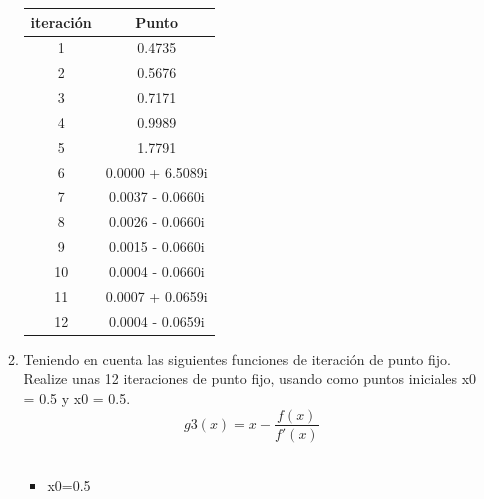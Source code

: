\documentclass{udparticle}
\begin{document}
\begin{enumerate}
\begin{enumerate}
\begin{table}[H]
\begin{tabular} { |c|c|}
        \hline
        iteración  &  Punto\\
        \hline
        1 &  0.4735       \\
         \hline
        2 &   0.5676     \\
         \hline
        3 &  0.7171
       \\
         \hline
        4 &   0.9989     \\
         \hline
        5 & 1.7791        \\
         \hline
        6 &  0.0000 + 6.5089i      \\
         \hline
        7 &   0.0037 - 0.0660i       \\
         \hline
        8 &     0.0026 - 0.0660i   \\
         \hline
        9 &   0.0015 - 0.0660i       \\
         \hline
        10 &    0.0004 - 0.0660i      \\
         \hline
        11 &    0.0007 + 0.0659i \\
         \hline
        12 &   0.0004 - 0.0659i       \\
        \hline
        
        \end{tabular}
        
    \end{table}
 \vspace{3cm}   
 \item Teniendo en cuenta las siguientes funciones de iteración de punto fijo.  Realize unas 12 iteraciones de punto fijo, usando como puntos iniciales x0 = 0.5 y x0 = 0.5.\\   
 
 \begin{equation}
 g3(x) = x-\frac{f(x)}
{f'(x)}
\end{equation}
\\
 \begin{itemize}
\item x0=0.5
\end{itemize}

\begin{table}[H]
    \centering
        \begin{tabular} { |c|c|}
        

\end{tabular}
\end{table}
\end{enumerate}
\end{enumerate}
\end{document}
